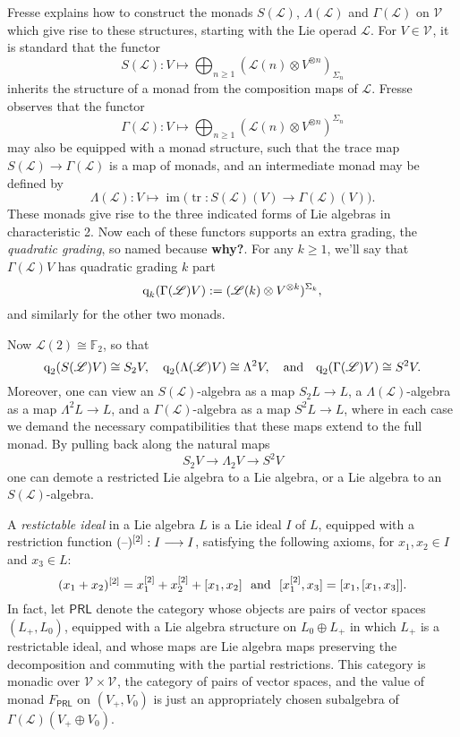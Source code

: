 \documentclass[11pt]{amsart}
\theoremstyle{plain}
\theoremstyle{definition}
\DeclareMathOperator{\im}{im}
\DeclareMathOperator{\trace}{tr}
\newcommand{\DASH}{\textup{--}}
\renewcommand{\to}{\longrightarrow}
\newcommand{\scrL}{\mathscr{L}}
\newcommand{\calV}{\mathcal{V}}
\theoremstyle{plain}
\newcommand{\LieOperad}{{\scrL}}
\newcommand{\restn}[1]{#1^{[2]}}
\newcommand{\vect}[2]{\calV^{#1}_{#2}}
\newcommand{\quadgrad}[1]{\textup{q}_{#1}}
\newcommand{\F}{\mathbb{F}}
\begin{document}
\begin{Conventions and notation}
Fresse \cite{FresseSimplicialAlgs.pdf} explains how to construct the monads $S(\LieOperad)$, $\Lambda(\LieOperad)$ and $\Gamma(\LieOperad)$ on $\vect{}{}$ which give rise to these structures, starting with the Lie operad $\LieOperad$. For $V\in\vect{}{}$, it is standard that the functor
\[S(\LieOperad):V\mapsto \bigoplus_{n\geq1}(\LieOperad(n)\otimes V^{\otimes n})_{\Sigma_n}\]
inherits the structure of a monad from the composition maps of $\LieOperad$. Fresse observes that the functor
\[\Gamma(\LieOperad):V\mapsto \bigoplus_{n\geq1}(\LieOperad(n)\otimes V^{\otimes n})^{\Sigma_n}\]
may also be equipped with a monad structure, such that the trace map $S(\LieOperad)\to \Gamma(\LieOperad)$
is a map of monads, and an intermediate monad may be defined by
\[\Lambda(\LieOperad):V\mapsto\im\bigl(\trace:S(\LieOperad)(V)\to \Gamma(\LieOperad)(V)\bigr).\]
These monads give rise to the three indicated forms of Lie algebras in characteristic 2. Now each of these functors supports an extra grading, the \emph{quadratic grading}, so named because \textbf{why?}. For any $k\geq1$, we'll say that $\Gamma(\LieOperad)V$ has quadratic grading $k$ part
\[\quadgrad{k}(\Gamma(\LieOperad)V):=(\LieOperad(k)\otimes V^{\otimes k})^{\Sigma_k},\]
and similarly for the other two monads.

 Now $\LieOperad(2)\cong\F_2$, so that
\[\quadgrad{2}(S(\LieOperad)V)\cong S_2V,\quad \quadgrad{2}(\Lambda(\LieOperad)V)\cong \Lambda^2V,\quad\textup{and}\quad\quadgrad{2}(\Gamma(\LieOperad)V)\cong S^2V.\]
Moreover, one can view an $S(\LieOperad)$-algebra as a map $S_2L\to L$, a $\Lambda(\LieOperad)$-algebra as a map $\Lambda^2L\to L$, and a $\Gamma(\LieOperad)$-algebra as a map $S^2L\to L$, where in each case we demand the necessary compatibilities that these maps extend to the full monad. %
By pulling back along the natural maps
\[S_2V\to \Lambda_2 V\to S^2V\]
one can demote a restricted Lie algebra to a Lie algebra, or a Lie algebra to an $S(\LieOperad)$-algebra.

A \emph{restictable ideal} in a Lie algebra $L$ is a Lie ideal $I$ of $L$, equipped with a restriction function $\restn{(\DASH)}:I\to I$, satisfying the following axioms, for $x_1,x_2\in I$ and $x_3\in L$:
\[\restn{(x_1+x_2)}=\restn{x_1}+\restn{x_2}+[x_1,x_2]\textup{ \ and \ }[\restn{x_1},x_3]=[x_1,[x_1,x_3]].\]
In fact, let $\mathsf{PRL}$ denote the category whose objects are pairs of vector spaces $(L_+,L_0)$, equipped with a Lie algebra structure on $L_0\oplus L_+$ in which $L_+$ is a restrictable ideal, and whose maps are Lie algebra maps preserving the decomposition and commuting with the partial restrictions. This category is monadic over $\vect{}{}\times\vect{}{}$, the category of pairs of vector spaces, and the value of monad $F_{\mathsf{PRL}}$  on $(V_+,V_0)$ is just an appropriately chosen subalgebra of $\Gamma(\LieOperad)(V_+\oplus V_0)$.



\end{Conventions and notation}
\end{document}
